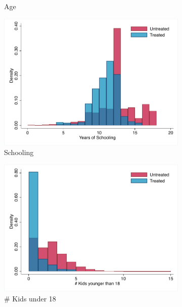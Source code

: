 \documentclass{article}
\begin{document}
\begin{solution}
\begin{figure}[htb]
\begin{subfigure}[b]{0.4\textwidth}
         \caption{Age}
     \end{subfigure}
     \begin{subfigure}[b]{0.4\textwidth}
         \centering
         \includegraphics[width=\textwidth]{ps2/Figures/ps2_q2d_educ.pdf}
         \caption{Schooling}
     \end{subfigure}
     \hfill
     \begin{subfigure}[b]{0.4\textwidth}
         \centering
         \includegraphics[width=\textwidth]{ps2/Figures/ps2_q2d_kids18.pdf}
         \caption{\# Kids under 18}
     \end{subfigure}
     \begin{subfigure}[b]{0.4\textwidth}
         \centering

\end{subfigure}
\end{figure}
\end{solution}
\end{document}
